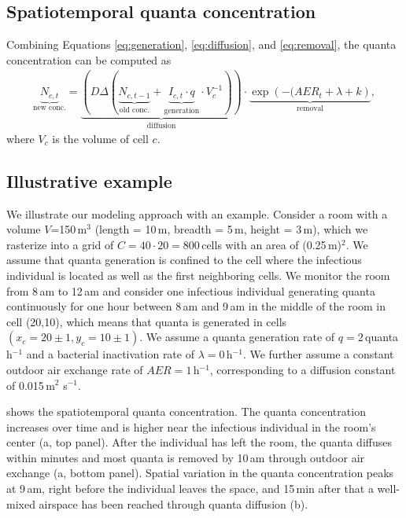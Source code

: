 \documentclass[fleqn,11pt]{wlscirep_supp}
\begin{document}
\subsection{Spatiotemporal quanta concentration}

Combining Equations \ref{eq:generation}, \ref{eq:diffusion}, and \ref{eq:removal}, the quanta concentration can be computed as
\begin{align}\label{eq:spattemp-N}
    \underbrace{N_{c,t}}_{\text{new conc.}} = \underbrace{\left(D \Delta (\underbrace{N_{c,t-1}}_{\text{old conc.}} + \underbrace{I_{c,t} \cdot q}_{\text{generation}} \cdot V_{c}^{-1})\right)}_{\text{diffusion}} \cdot \underbrace{\exp\left(-(AER_{t} + \lambda + k\right)}_{\text{removal}},
\end{align}
where $V_c$ is the volume of cell $c$.

\subsection{Illustrative example}\label{sec:example}

We illustrate our modeling approach with an example. Consider a room with a volume $V$=150\,m$^3$ (length = 10\,m, breadth = 5\,m, height = 3\,m), which we rasterize into a grid of $C = 40 \cdot 20 = 800$\,cells with an area of (0.25\,m)$^2$. We assume that quanta generation is confined to the cell where the infectious individual is located as well as the first neighboring cells. We monitor the room from 8\,am to 12\,am and consider one infectious individual generating quanta continuously for one hour between 8\,am and 9\,am in the middle of the room in cell (20,10), which means that quanta is generated in cells $(x_c = 20\pm1, y_c = 10\pm1)$. We assume a quanta generation rate of $q = 2$\,quanta h$^{-1}$ and a bacterial inactivation rate of $\lambda = 0$\,h$^{-1}$. We further assume a constant outdoor air exchange rate of $AER = 1$\,h$^{-1}$, corresponding to a diffusion constant of 0.015\,m$^2$ s$^{-1}$. 

 shows the spatiotemporal quanta concentration. The quanta concentration increases over time and is higher near the infectious individual in the room's center (a, top panel). After the individual has left the room, the quanta diffuses within minutes and most quanta is removed by 10\,am through outdoor air exchange (a, bottom panel). Spatial variation in the quanta concentration peaks at 9\,am, right before the individual leaves the space, and 15\,min after that a well-mixed airspace has been reached through quanta diffusion (b). 
\end{document}
